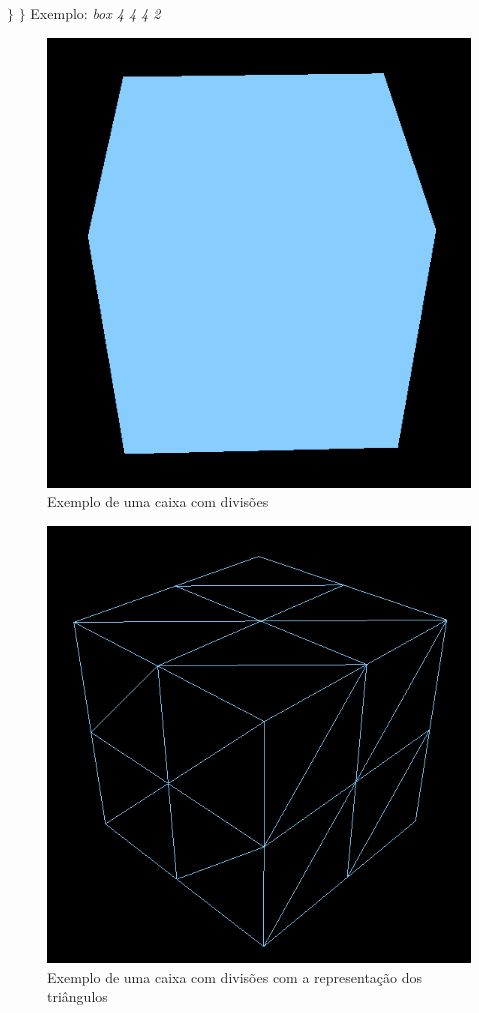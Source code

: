 \documentclass[12pt]{article}
\begin{document}
\par $\}$ \newline
$\}$\newpage
Exemplo: \textit{box 4 4 4 2}
\begin{figure}[H]
\centering\includegraphics[scale=0.45]{caixaP} 
\caption{\label{fig:controller}Exemplo de uma caixa com divisões}
\end{figure} \begin{figure}[H]
\centering\includegraphics[scale=0.4]{caixaT} 
\caption{\label{fig:controller}Exemplo de uma caixa com divisões com a representação dos triângulos}
\end{figure}
\newpage
\end{document}
